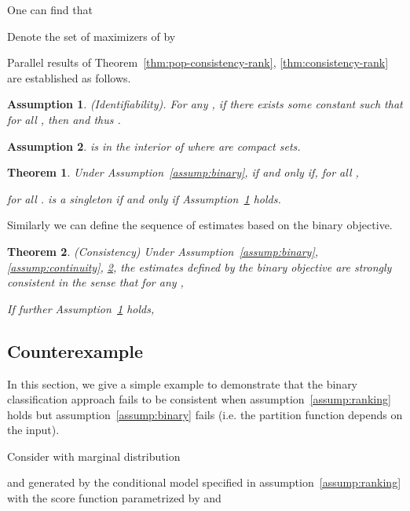 \documentclass[11pt,a4paper]{article}
\newtheorem{theorem}{Theorem}[section]
\newtheorem{assumption}{Assumption}[section]
\begin{document}
One can find that 
 
Denote the set of maximizers of
 by 

Parallel results of Theorem~\ref{thm:pop-consistency-rank}, \ref{thm:consistency-rank} are established as follows. 
\begin{assumption}
  (Identifiability). For any , if there exists some constant
 such that  for all , then  and thus .
  \label{assump:identifiability-binary}
\end{assumption}

\begin{assumption} 
   is in the interior of  where  are compact sets.
    \label{assump:compactness-binary}
\end{assumption}
\begin{theorem}
Under Assumption~\ref{assump:binary}, 
 if and only if, for all ,

for all .  is a singleton if and only if
Assumption~\ref{assump:identifiability-binary} holds.
\label{thm:pop-consistency-binary}
\end{theorem}





Similarly we can define the sequence of estimates
  based on the binary objective.





\begin{theorem}
  (Consistency) Under Assumption~\ref{assump:binary},
  \ref{assump:continuity}, \ref{assump:compactness-binary}, the
  estimates defined by the binary objective are strongly consistent
  in the sense that for any ,
  
If further Assumption~\ref{assump:identifiability-binary} holds, 

\label{thm:consistency-binary}
\end{theorem}



\subsection{Counterexample}
In this section, we give a simple example to demonstrate that the binary classification approach fails to be consistent when assumption~\ref{assump:ranking} holds but assumption~\ref{assump:binary} fails (i.e. the partition function depends on the input). 

Consider  with marginal distribution 

and  generated by the conditional model specified in assumption~\ref{assump:ranking} with  
the score function parametrized by  and 
\end{document}
